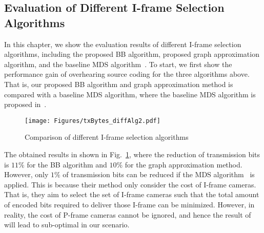 \subsection{Evaluation of Different I-frame Selection Algorithms}
In this chapter, we show the evaluation results of different I-frame selection algorithms, including the proposed BB algorithm, proposed graph approximation algorithm, and the baseline MDS algorithm~\cite{MWDS_baseline}.
To start, we first show the performance gain of overhearing source coding for the three algorithms above.
That is, our proposed BB algorithm and graph approximation method is compared with a baseline MDS algorithm, where the baseline MDS algorithm is proposed in~\cite{MWDS_baseline}.
%
\begin{figure}
\begin{center}
\texttt{[image: Figures/txBytes\_diffAlg2.pdf]}
\caption{\label{fig::txBytes_diffAlg} Comparison of different I-frame selection algorithms}
\end{center}
\end{figure}
%
The obtained results in shown in Fig.~\ref{fig::txBytes_diffAlg}, where the reduction of transmission bits is $11\%$ for the BB algorithm and $10\%$ for the graph approximation method.
However, only $1\%$ of transmission bits can be reduced if the MDS algorithm~\cite{MWDS_baseline} is applied.
This is because their method only consider the cost of I-frame cameras.
That is, they aim to select the set of I-frame cameras such that the total amount of encoded bits required to deliver those I-frame can be minimized.
However, in reality, the cost of P-frame cameras cannot be ignored, and hence the result of~\cite{MWDS_baseline} will lead to sub-optimal in our scenario.

